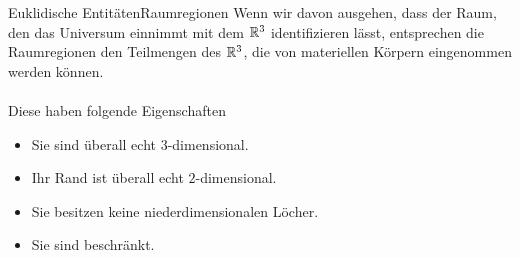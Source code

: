 \documentclass[10pt,xcolor={dvipsnames}]{beamer}
\begin{document}
\begin{frame}{Euklidische Entitäten}{Raumregionen}
    Wenn wir davon ausgehen, dass der Raum, den das Universum einnimmt mit dem $\mathbb{R}^3$ identifizieren lässt, entsprechen die Raumregionen den Teilmengen des $\mathbb{R}^3$, die von materiellen Körpern eingenommen werden können.\\ \ \\
    Diese haben folgende Eigenschaften
    \begin{itemize}
        \item Sie sind überall echt $3$-dimensional.
        \item Ihr Rand ist überall echt $2$-dimensional.
        \item Sie besitzen keine niederdimensionalen Löcher.
        \item Sie sind beschränkt.
    \end{itemize}
\end{frame}


\end{document}
